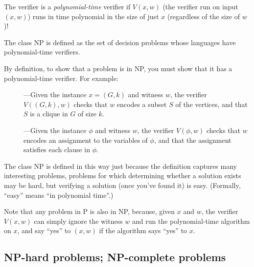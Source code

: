 \documentclass[11pt]{article}
\begin{document}
The verifier is a \emph{polynomial-time} verifier if
$V(x,w)$ (the verifier run on input $(x,w)$)
runs in time polynomial in the size of just $x$
(regardless of the size of $w$)!

The class NP is defined as the set of decision problems whose languages
have polynomial-time verifiers.

By definition, to show that a problem is in NP,
you must show that it has a polynomial-time verifier.
For example:

\begin{description}


\item[]---Given the instance $x=(G,k)$ and witness $w$,
  the verifier $V((G,k), w)$ checks that $w$ encodes a subset $S$ of the vertices,
  and that $S$ is a clique in $G$ of size $k$.


\item[]---Given the instance $\phi$ and witness $w$,
  the verifier $V(\phi, w)$ checks that $w$ encodes an assignment to the
  variables of $\phi$, and that the assignment satisfies each clause in $\phi$.
\end{description}

The class NP is defined in this way just because the definition captures
many interesting problems, problems for which determining whether a solution exists
may be hard, but verifying a solution (once you've found it) is easy.
(Formally, ``easy'' means ``in polynomial time''.)

Note that any problem in P is also in NP, because,
given $x$ and $w$, the verifier $V(x,w)$ can simply ignore the witness $w$
and run the polynomial-time algorithm on $x$,
and say ``yes'' to $(x,w)$ if the algorithm says ``yes'' to $x$.

\subsection{NP-hard problems; NP-complete problems}
\end{document}
